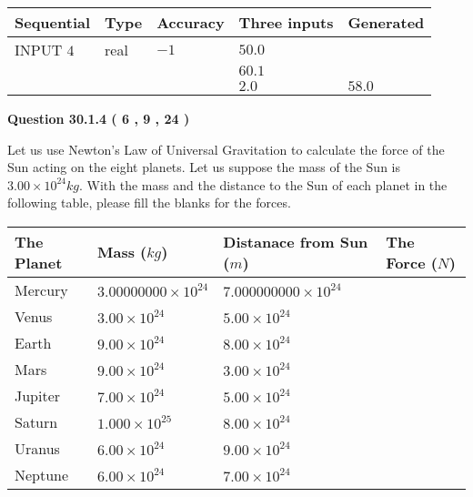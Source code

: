 \documentclass[12pt]{article}
\begin{document}
   
  
  
\noindent\begin{tabular}{|l|l|l|l|l|}
\hline
 Sequential & Type & Accuracy & Three inputs & Generated \\ 
\hline
 
 
  INPUT $            4 $ & real & $           -1  $ & $
 50.0
  $ & \\
  & & &  $
 60.1
  $ & \\
  & & &  $
 2.0
 $ & $ 58.0 $ 
 \\  \hline  
 \end{tabular}
   
   
  
\vspace{0.2in}
  
{\textbf{\Large{Question
30.1.4 
 (           6 ,           9 ,          24 )
}}}
  
  
Let us use Newton's Law of Universal Gravitation to calculate the force
of the Sun acting on the eight planets. Let us suppose the mass of the
Sun is $ %
3.00 \times 10^{24} kg$. With the mass and the
distance to the Sun of each planet in the following table, please fill
the blanks for the forces.
 
\vspace{0.2in}
 
 
\begin{tabular}{|l|l|l|l|}
\hline
The Planet & Mass ($kg$) & Distanace from Sun ($m$) & The Force ($N$)\\
\hline
Mercury  &
           $ %
3.00000000 \times 10^{24} $   &
             $ %
7.000000000 \times 10^{24} $    &
\\  \hline
Venus    &
           $ %
3.00 \times 10^{24} $    &
             $ %
5.00 \times 10^{24} $    &
\\  \hline
Earth    &
           $ %
9.00 \times 10^{24} $    &
             $ %
8.00 \times 10^{24} $    &
\\   \hline
Mars     &
           $ %
9.00 \times 10^{24} $    &
             $ %
3.00 \times 10^{24} $    &
\\   \hline
Jupiter  &
           $ %
7.00 \times 10^{24} $    &
             $ %
5.00 \times 10^{24} $    &
\\  \hline
Saturn   &
           $ %
1.000 \times 10^{25}$    &
             $ %
8.00 \times 10^{24}$    &
\\  \hline
Uranus   &
           $ %
6.00 \times 10^{24} $    &
             $ %
9.00 \times 10^{24} $    &
\\  \hline
Neptune  &
           $ %
6.00 \times 10^{24} $    &
             $ %
7.00 \times 10^{24} $    &
\\  \hline
 
\end{tabular}
 
\end{document}
